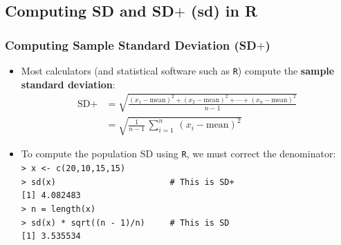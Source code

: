 \documentclass[t]{beamer}
\begin{document}
\subsection[sd]{Computing SD and SD$+$ (sd) in R}
\begin{frame}[t]\frametitle{Computing Sample Standard Deviation (SD$+$)}
{\small
\begin{itemize}
\item Most calculators (and statistical software such as \texttt{R}) compute
   the \textbf{sample standard deviation}:
\begin{align*}
\mbox{SD}+&= \sqrt{\frac{(x_1-\mbox{mean})^2+(x_2-\mbox{mean})^2+\cdots + 
           (x_n-\mbox{mean})^2}{n-1}}\\
                               &=\sqrt{\frac{1}{n-1}\,\sum_{i=1}^n\,(x_i-\mbox{mean})^2}
\end{align*}
\item To compute the population SD using \texttt{R}, we must correct the denominator:
\\[3pt]
      \texttt{> x <- c(20,10,15,15)}\\[3pt]
      \texttt{> sd(x)  \ \ \ \ \ \ \ \ \ \ \ \ \ \ \ \ \ \ \ \ \ \ \# This is SD+}\\
      \texttt{[1] 4.082483}\\[3pt]
      \texttt{> n = length(x)}\\
      \texttt{> sd(x) * sqrt((n - 1)/n)   \ \ \ \ \# This is SD}\\
      \texttt{[1] 3.535534}\\[3pt]
\end{itemize}
}
\label{lastpage}
\end{frame}
\end{document}
